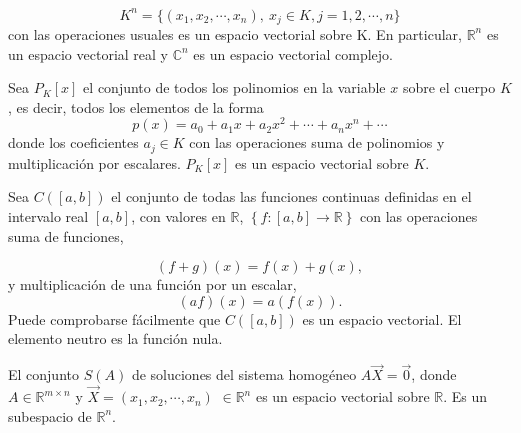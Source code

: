 \bigskip

\begin{example}   
$$K^n=\{(x_1,x_2, \cdots, x_n), ~ x_j \in K, j=1,2, \cdots, n\}$$
con las operaciones usuales es un espacio vectorial sobre K. En particular, $\mathbb{R}^{n}$ es un espacio vectorial real y  $\mathbb{C}^{n}$ es un espacio vectorial complejo.
\end{example}

\bigskip

\begin{example}
Sea $P_K \left[x\right]$ el conjunto de todos los polinomios en la variable $x$ sobre el cuerpo $K$, es decir, todos los elementos de la forma
$$p(x)= a_0 + a_1 x +a_2 x^2 + \cdots + a_n x^n  + \cdots $$ 
donde los coeficientes $a_j \in K$ con las operaciones suma de polinomios y multiplicación por escalares.  $P_K\left[x\right]$ es un espacio vectorial sobre $K$.
\end{example}

\bigskip


\begin{example} 
Sea $C(\left[a,b\right])$ el conjunto de todas las funciones continuas definidas en el intervalo real $[a,b]$, con valores en $\mathbb{R}$, $\left \{ f: [a,b]  \rightarrow  \mathbb{R} \right \}$ con las operaciones suma de funciones,

$$(f+g)(x)=f(x)+g(x),$$ y multiplicación de una función por un escalar,
$$(af)(x)=a(f(x)).$$
Puede comprobarse fácilmente  que  $C([a,b])$ es un espacio vectorial. El elemento neutro es la función nula.
\end{example}


\bigskip


\begin{example} 
El conjunto $S(A)$ de soluciones del sistema homogéneo $A\vec{X}=\vec{0}$, donde $A \in \mathbb{R}^{m \times n}$ y $\vec{X}=(x_1, x_2, \cdots, x_n)$ $\in \mathbb{R}^{n}$ es un  espacio vectorial sobre $\mathbb{R}$. Es un subespacio de  $\mathbb{R}^{n}$.
\end{example}

\bigskip

